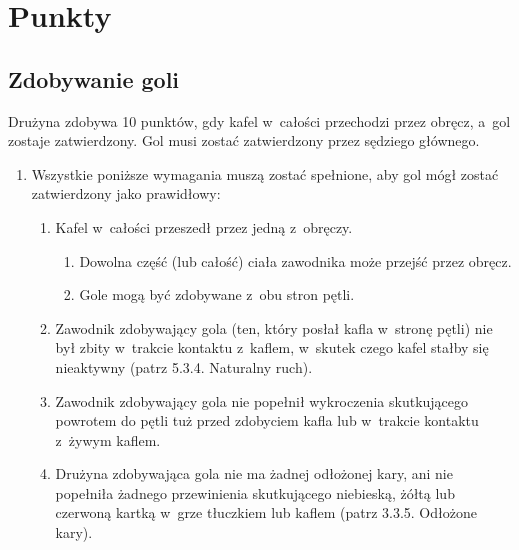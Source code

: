\documentclass[12pt,a4paper]{article}
\renewcommand{\subsubsection}[1]{
  \oldsubsubsection{#1}%
  \leftskip1.3cm
}
\begin{document}
\pagebreak
\section{Punkty}

\subsection{Zdobywanie goli}

\subsubsection{Prawidłowy gol}
Drużyna zdobywa 10 punktów, gdy kafel w~całości przechodzi przez obręcz, a~gol zostaje zatwierdzony. Gol musi
zostać zatwierdzony przez sędziego głównego.

\begin{enumerate}
	\item
	      Wszystkie poniższe wymagania muszą zostać spełnione, aby gol mógł
	      zostać zatwierdzony jako prawidłowy:

	      \begin{enumerate}
		      \item
		            Kafel w~całości przeszedł przez jedną z~obręczy.

		            \begin{enumerate}
			            \item
			                  Dowolna część (lub całość) ciała zawodnika może przejść przez
			                  obręcz.
			            \item
			                  Gole mogą być zdobywane z~obu stron pętli.
		            \end{enumerate}
		      \item
		            Zawodnik zdobywający gola (ten, który posłał kafla w~stronę pętli)
		            nie był zbity w~trakcie kontaktu z~kaflem, w~skutek czego kafel
		            stałby się nieaktywny (patrz 5.3.4. Naturalny ruch).
		      \item
		            Zawodnik zdobywający gola nie popełnił wykroczenia skutkującego
		            powrotem do pętli tuż przed zdobyciem kafla lub w~trakcie kontaktu
		            z~żywym kaflem.
		      \item
		            Drużyna zdobywająca gola nie ma żadnej odłożonej kary, ani nie
		            popełniła żadnego przewinienia skutkującego niebieską, żółtą lub
		            czerwoną kartką w~grze tłuczkiem lub kaflem (patrz 3.3.5. Odłożone
		            kary).


\end{enumerate}
\end{enumerate}
\end{document}
